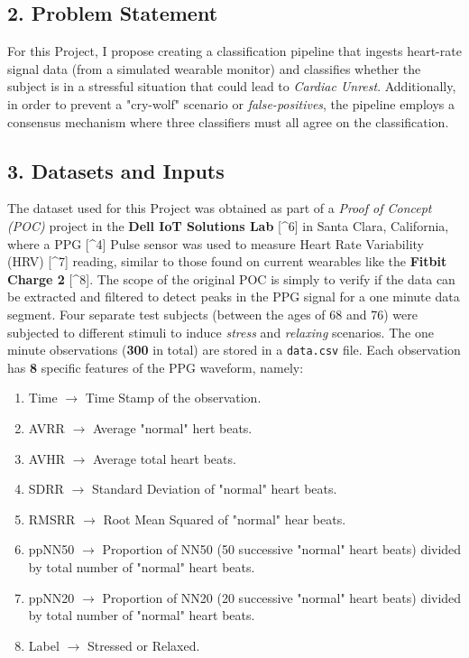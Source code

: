 \documentclass{scrreprt}
\begin{document}
\subsection{2. Problem Statement}\label{problem-statement}

For this Project, I propose creating a classification pipeline that
ingests heart-rate signal data (from a simulated wearable monitor) and
classifies whether the subject is in a stressful situation that could
lead to \emph{Cardiac Unrest}. Additionally, in order to prevent a
"cry-wolf" scenario or \emph{false-positives}, the pipeline employs a
consensus mechanism where three classifiers must all agree on the
classification.

\subsection{3. Datasets and Inputs}\label{datasets-and-inputs}

The dataset used for this Project was obtained as part of a \emph{Proof
of Concept (POC)} project in the \textbf{Dell IoT Solutions Lab}
{[}\^{}6{]} in Santa Clara, California, where a PPG {[}\^{}4{]} Pulse
sensor was used to measure Heart Rate Variability (HRV) {[}\^{}7{]}
reading, similar to those found on current wearables like the
\textbf{Fitbit Charge 2} {[}\^{}8{]}. The scope of the original POC is
simply to verify if the data can be extracted and filtered to detect
peaks in the PPG signal for a one minute data segment. Four separate
test subjects (between the ages of 68 and 76) were subjected to
different stimuli to induce \emph{stress} and \emph{relaxing} scenarios.
The one minute observations (\textbf{300} in total) are stored in a
\texttt{data.csv} file. Each observation has \textbf{8} specific
features of the PPG waveform, namely:

\begin{enumerate}
\def\labelenumi{\arabic{enumi}.}
\itemsep1pt\parskip0pt
\item
  Time $\rightarrow$ Time Stamp of the observation.
\item
  AVRR $\rightarrow$ Average "normal" hert beats.
\item
  AVHR $\rightarrow$ Average total heart beats.
\item
  SDRR $\rightarrow$ Standard Deviation of "normal" heart beats.
\item
  RMSRR $\rightarrow$ Root Mean Squared of "normal" hear beats.
\item
  ppNN50 $\rightarrow$ Proportion of NN50 (50 successive "normal" heart
  beats) divided by total number of "normal" heart beats.
\item
  ppNN20 $\rightarrow$ Proportion of NN20 (20 successive "normal" heart
  beats) divided by total number of "normal" heart beats.
\item
  Label $\rightarrow$ Stressed or Relaxed.
\end{enumerate}
\end{document}
